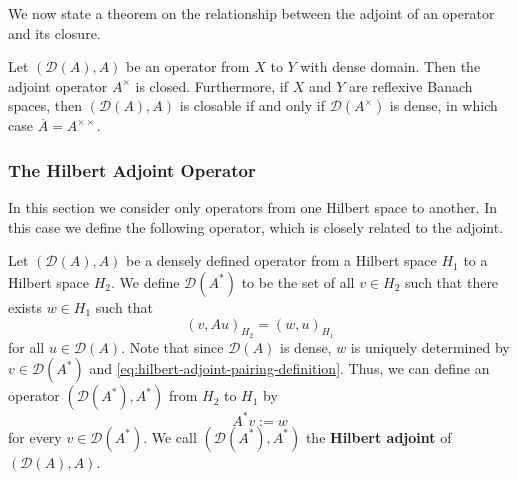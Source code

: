 We now state a theorem on the relationship between the adjoint of an operator and its closure.

\begin{Theorem}
\label{thm:adjoint-closedness-and-double-adjoint-closure}
Let $(\mathcal{D}(A),A)$ be an operator from $X$ to $Y$ with dense domain. Then the adjoint operator $A^\times$ is closed. Furthermore, if $X$ and $Y$ are reflexive Banach spaces, then $(\mathcal{D}(A),A)$ is closable if and only if $\mathcal{D}(A^\times)$ is dense, in which case $\overline A=A^{\times\times}$.
\end{Theorem}

\begingroup
{}
\renewcommand{\endProof}{\par\nobreak\hfill$\blacksquare$\par\vspace{0.1cm}}
\endgroup

\subsubsection{The Hilbert Adjoint Operator}\label{subsec:hilbert-adjoint-operator}

In this section we consider only operators from one Hilbert space to another. In this case we define the following operator, which is closely related to the adjoint.

\begin{Definition}
\label{def:hilbert-adjoint-operator}
Let $(\mathcal{D}(A),A)$ be a densely defined operator from a Hilbert space $H_1$ to a Hilbert space $H_2$. We define $\mathcal{D}(A^*)$ to be the set of all $v\in H_2$ such that there exists $w\in H_1$ such that
\begin{equation}\label{eq:hilbert-adjoint-pairing-definition}
(v,Au)_{H_2}=(w,u)_{H_1}
\end{equation}
for all $u\in\mathcal{D}(A)$. Note that since $\mathcal{D}(A)$ is dense, $w$ is uniquely determined by $v\in\mathcal{D}(A^*)$ and \eqref{eq:hilbert-adjoint-pairing-definition}. Thus, we can define an operator $(\mathcal{D}(A^*),A^*)$ from $H_2$ to $H_1$ by
\begin{equation}\label{eq:hilbert-adjoint-action-definition}
A^*v:=w
\end{equation}
for every $v\in\mathcal{D}(A^*)$. We call $(\mathcal{D}(A^*),A^*)$ the \textbf{Hilbert adjoint} of $(\mathcal{D}(A),A)$.
\end{Definition}

